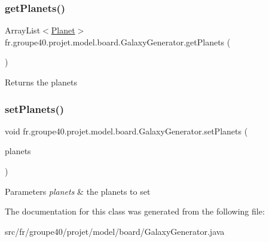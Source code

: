 \subsubsection{\texorpdfstring{get\+Planets()}{getPlanets()}}
{\footnotesize\ttfamily Array\+List$<$\mbox{\hyperlink{classfr_1_1groupe40_1_1projet_1_1model_1_1planets_1_1_planet}{Planet}}$>$ fr.\+groupe40.\+projet.\+model.\+board.\+Galaxy\+Generator.\+get\+Planets (\begin{DoxyParamCaption}{ }\end{DoxyParamCaption})}

\begin{DoxyReturn}{Returns}
the planets 
\end{DoxyReturn}
\mbox{\label{classfr_1_1groupe40_1_1projet_1_1model_1_1board_1_1_galaxy_generator_a67bac9f8bd2561972535ec64c63340ce}} 
\subsubsection{\texorpdfstring{set\+Planets()}{setPlanets()}}
{\footnotesize\ttfamily void fr.\+groupe40.\+projet.\+model.\+board.\+Galaxy\+Generator.\+set\+Planets (\begin{DoxyParamCaption}\item[{Array\+List$<$ \mbox{\hyperlink{classfr_1_1groupe40_1_1projet_1_1model_1_1planets_1_1_planet}{Planet}} $>$}]{planets }\end{DoxyParamCaption})}


\begin{DoxyParams}{Parameters}
{\em planets} & the planets to set \\
\hline
\end{DoxyParams}


The documentation for this class was generated from the following file\+:\begin{DoxyCompactItemize}
\item 
src/fr/groupe40/projet/model/board/Galaxy\+Generator.\+java\end{DoxyCompactItemize}

